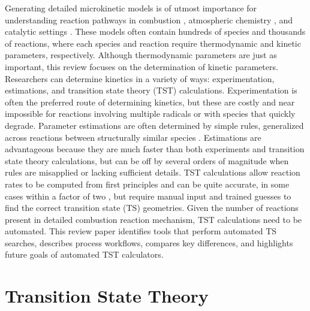 \documentclass[preprint, 11pt]{elsarticle} %
\begin{document}
Generating detailed microkinetic models is of utmost importance for understanding reaction pathways in combustion \cite{VandeVijver:2015}, atmospheric chemistry \cite{Vereecken:2012}, and catalytic settings \cite{chorkendorff:2007}.
These models often contain hundreds of species and thousands of reactions, where each species and reaction require thermodynamic and kinetic parameters, respectively.  
Although thermodynamic parameters are just as important, this review focuses on the determination of kinetic parameters.
Researchers can determine kinetics in a variety of ways: experimentation, estimations, and transition state theory (TST) calculations.
Experimentation is often the preferred route of determining kinetics, but these are costly and near impossible for reactions involving multiple radicals or with species that quickly degrade.
Parameter estimations are often determined by simple rules, generalized across reactions between structurally similar species \cite{Curran:1998bx}. 
Estimations are advantageous because they are much faster than both experiments and transition state theory calculations, but can be off by several orders of magnitude when rules are misapplied or lacking sufficient details. 
TST calculations allow reaction rates to be computed from first principles and can be quite accurate, in some cases within a factor of two \cite{Klippenstein:2017eu}, but require manual input and trained guesses to find the correct transition state (TS) geometries. 
Given the number of reactions present in detailed combustion reaction mechanism, TST calculations need to be automated.
This review paper identifies tools that perform automated TS searches, describes process workflows, compares key differences, and highlights future goals of automated TST calculators.


\section{Transition State Theory}


\end{document}
